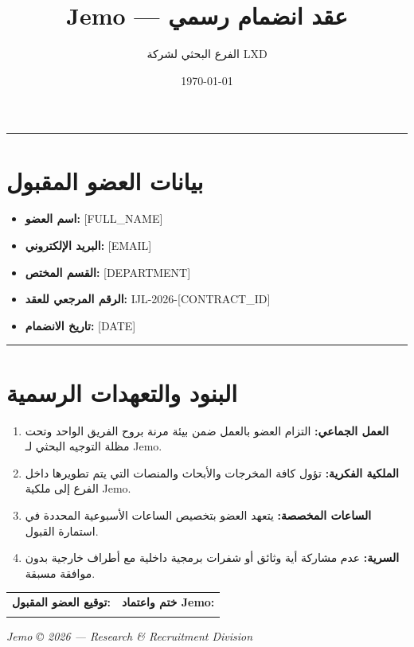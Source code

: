 \documentclass[12pt,a4paper]{article}
\title{\textbf{Jemo — عقد انضمام رسمي}}
\author{الفرع البحثي لشركة LXD}
\date{\today}
\begin{document}
\maketitle
\thispagestyle{empty}

\hrule
\vspace{0.5cm}

\section*{بيانات العضو المقبول}
\begin{itemize}[leftmargin=*]
  \item \textbf{اسم العضو:} [FULL_NAME]
  \item \textbf{البريد الإلكتروني:} [EMAIL]
  \item \textbf{القسم المختص:} [DEPARTMENT]
  \item \textbf{الرقم المرجعي للعقد:} IJL-2026-[CONTRACT_ID]
  \item \textbf{تاريخ الانضمام:} [DATE]
\end{itemize}

\vspace{0.5cm}
\hrule
\vspace{0.5cm}

\section*{البنود والتعهدات الرسمية}
\begin{enumerate}
  \item \textbf{العمل الجماعي:} التزام العضو بالعمل ضمن بيئة مرنة بروح الفريق الواحد وتحت مظلة التوجيه البحثي لـ Jemo.
  \item \textbf{الملكية الفكرية:} تؤول كافة المخرجات والأبحاث والمنصات التي يتم تطويرها داخل الفرع إلى ملكية Jemo.
  \item \textbf{الساعات المخصصة:} يتعهد العضو بتخصيص الساعات الأسبوعية المحددة في استمارة القبول.
  \item \textbf{السرية:} عدم مشاركة أية وثائق أو شفرات برمجية داخلية مع أطراف خارجية بدون موافقة مسبقة.
\end{enumerate}

\vspace{2cm}
\noindent
\begin{tabular}{@{}p{}p{}@{}}
  \textbf{توقيع العضو المقبول:} & \textbf{ختم واعتماد Jemo:} \\[1.5cm]
  \dotfill & \dotfill \\
\end{tabular}

\vfill
\begin{center}
  \small \textit{Jemo © 2026 — Research \& Recruitment Division}
\end{center}
\end{document}
